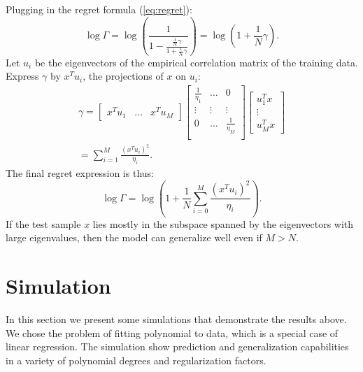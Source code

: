 \documentclass[conference,letterpaper]{IEEEtran}
\begin{document}
Plugging in the regret formula (\ref{eq:regret}):
\begin{equation}
\log \Gamma = \log \left( \frac{1}{1-\frac{\frac{1}{N}\gamma}{1+\frac{1}{N}\gamma}} \right)
=  \log \left( 1+\frac{1}{N} \gamma \right).
\end{equation}
Let $u_i$ be the eigenvectors of the empirical correlation matrix of the training data. Express $\gamma$ by $x^Tu_i$, the projections of $x$ on $u_i$:
\begin{multline}
\gamma = 
\begin{bmatrix}
x^T u_1 & \hdots & x^T u_M
\end{bmatrix}
\begin{bmatrix}
\frac{1}{\eta_1} & \hdots & 0 \\
\vdots & \vdots &  \vdots \\
0 & \hdots &  \frac{1}{\eta_M} \\
\end{bmatrix}
\begin{bmatrix}
u_1^T x \\ \vdots \\ u_M^T x
\end{bmatrix} \\
= \sum_{i=1}^{M} \frac{\left(x^Tu_i\right)^2}{\eta_i}.
\end{multline}
The final regret expression is thus:
\begin{equation}
\log \Gamma = \log \left(1 + \frac{1}{N} \sum_{i=0}^{M} \frac{\left(x^Tu_i\right)^2 }{\eta_i}\right).
\end{equation}
If the test sample $x$ lies mostly in the subspace spanned by the eigenvectors with large eigenvalues, then the model can generalize well even if $M>N$.

\section{Simulation} \label{sec:simulation}
In this section we present some simulations that demonstrate the results above. We chose the problem of fitting polynomial to data, which is a special case of linear regression.
The simulation show prediction and generalization capabilities in a variety of polynomial degrees and regularization factors.
\end{document}
